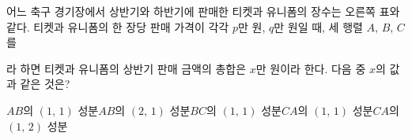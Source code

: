 \noindent\begin{minipage}[t]{0.58\linewidth}\vspace{0pt}\raggedright 어느 축구 경기장에서 상반기와 하반기에 판매한 티켓과 유니폼의 장수는 오른쪽 표와 같다. 티켓과 유니폼의 한 장당 판매 가격이 각각 $p$만 원, $q$만 원일 때, 세 행렬 $A$, $B$, $C$를 \par\smallskip\end{minipage}\hfill\begin{minipage}[t]{0.4\linewidth}\vspace{0pt}\centering \resizebox{\ifdim\width>\linewidth\linewidth\else\width\fi}{!}{}\end{minipage}\par
\noindent {}\par\smallskip\noindent 라 하면 티켓과 유니폼의 상반기 판매 금액의 총합은 $x$만 원이라 한다. 다음 중 $x$의 값과 같은 것은?
\begin{choicesii}{$AB$의 $(1,\,1)$ 성분}{$AB$의 $(2,\,1)$ 성분}{$BC$의 $(1,\,1)$ 성분}{$CA$의 $(1,\,1)$ 성분}{$CA$의 $(1,\,2)$ 성분}\end{choicesii}

